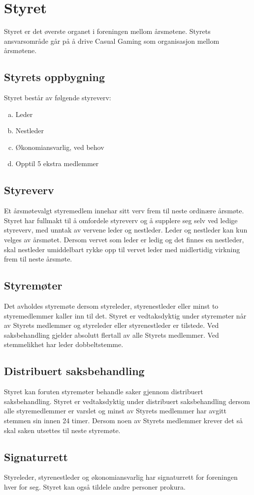 \chapter{Styret}
Styret er det øverste organet i foreningen mellom årsmøtene. Styrets ansvarsområde går på å drive Casual Gaming som organisasjon mellom årsmøtene.

\section{Styrets oppbygning}
Styret består av følgende styreverv:
\begin{enumerate}[a.]
    \item Leder
    \item Nestleder
    \item Økonomiansvarlig, ved behov
    \item Opptil 5 ekstra medlemmer
\end{enumerate}

\section{Styreverv}
Et årsmøtevalgt styremedlem innehar sitt verv frem til neste ordinære årsmøte. Styret har fullmakt til å omfordele styreverv og å supplere seg selv ved ledige styreverv, med unntak av vervene leder og nestleder. Leder og nestleder kan kun velges av årsmøtet. Dersom vervet som leder er ledig og det finnes en nestleder, skal nestleder umiddelbart rykke opp til vervet leder med midlertidig virkning frem til neste årsmøte.

\section{Styremøter}
Det avholdes styremøte dersom styreleder, styrenestleder eller minst to styremedlemmer kaller inn til det. Styret er vedtaksdyktig under styremøter når  av Styrets medlemmer og styreleder eller styrenestleder er tilstede. Ved saksbehandling gjelder absolutt flertall av alle Styrets medlemmer. Ved stemmelikhet har leder dobbeltstemme.

\section{Distribuert saksbehandling}
Styret kan foruten styremøter behandle saker gjennom distribuert saksbehandling. Styret er vedtaksdyktig under distribuert saksbehandling dersom alle styremedlemmer er varslet og minst  av Styrets medlemmer har avgitt stemmen sin innen 24 timer. Dersom noen av Styrets medlemmer krever det så skal saken utsettes til neste styremøte.

\section{Signaturrett}
Styreleder, styrenestleder og økonomiansvarlig har signaturrett for foreningen hver for seg. Styret kan også tildele andre personer prokura.
